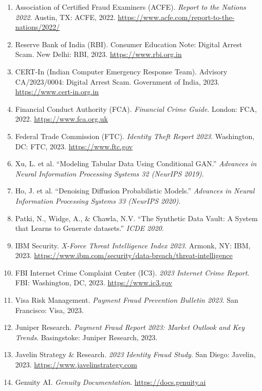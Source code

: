 \documentclass[12pt,a4paper,oneside]{book}
\begin{document}
\begin{enumerate}
    \small
    \item Association of Certified Fraud Examiners (ACFE). \textit{Report to the Nations 2022}. Austin, TX: ACFE, 2022. \url{https://www.acfe.com/report-to-the-nations/2022/}
    \item Reserve Bank of India (RBI). Consumer Education Note: Digital Arrest Scam. New Delhi: RBI, 2023. \url{https://www.rbi.org.in}
    \item CERT-In (Indian Computer Emergency Response Team). Advisory CA/2023/0004: Digital Arrest Scam. Government of India, 2023. \url{https://www.cert-in.org.in}
    \item Financial Conduct Authority (FCA). \textit{Financial Crime Guide}. London: FCA, 2022. \url{https://www.fca.org.uk}
    \item Federal Trade Commission (FTC). \textit{Identity Theft Report 2023}. Washington, DC: FTC, 2023. \url{https://www.ftc.gov}
    \item Xu, L. et al. ``Modeling Tabular Data Using Conditional GAN.'' \textit{Advances in Neural Information Processing Systems 32 (NeurIPS 2019)}.
    \item Ho, J. et al. ``Denoising Diffusion Probabilistic Models.'' \textit{Advances in Neural Information Processing Systems 33 (NeurIPS 2020)}.
    \item Patki, N., Widge, A., \& Chawla, N.V. ``The Synthetic Data Vault: A System that Learns to Generate datasets.'' \textit{ICDE 2020}.
    \item IBM Security. \textit{X-Force Threat Intelligence Index 2023}. Armonk, NY: IBM, 2023. \url{https://www.ibm.com/security/data-breach/threat-intelligence}
    \item FBI Internet Crime Complaint Center (IC3). \textit{2023 Internet Crime Report}. FBI: Washington, DC, 2023. \url{https://www.ic3.gov}
    \item Visa Risk Management. \textit{Payment Fraud Prevention Bulletin 2023}. San Francisco: Visa, 2023.
    \item Juniper Research. \textit{Payment Fraud Report 2023: Market Outlook and Key Trends}. Basingstoke: Juniper Research, 2023.
    \item Javelin Strategy \& Research. \textit{2023 Identity Fraud Study}. San Diego: Javelin, 2023. \url{https://www.javelinstrategy.com}
    \item Genuity AI. \textit{Genuity Documentation}. \url{https://docs.genuity.ai}
\end{enumerate}
\end{document}
